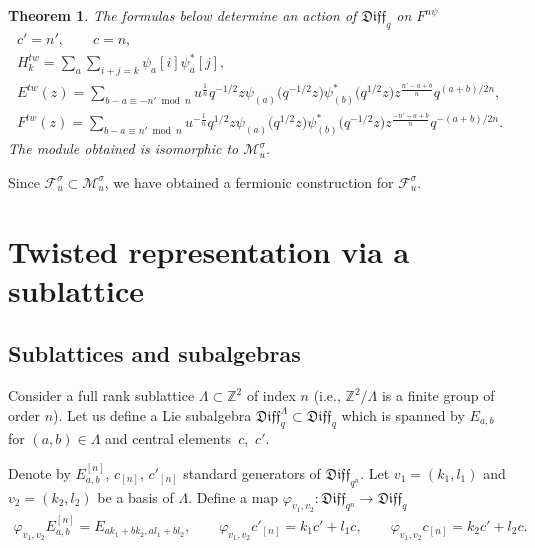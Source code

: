 \documentclass[11pt]{article}
\numberwithin{equation}{section}
\newtheorem{Theorem}{Theorem}[section]
\theoremstyle{definition}
\newcommand{\qD}{\mathfrak{Diff}_q}
\newcommand{\qDn}{\mathfrak{Diff}_{q^n}}
\newcommand{\psia}{\psi_{({a})}}
\newcommand{\psib}{\psi^*_{( b )}}
\begin{document}
\begin{Theorem}\label{TheFermionicTh}
The formulas below determine an action of $\qD$ on $F^{n\psi}$
\begin{gather}
c' = n', \qquad c=n,\nonumber\\
H^{tw}_k = \sum_{a} \sum_{i+j=k} \psi_a [i] \psi^*_a [j] , \nonumber\\
E^{tw}(z) = \sum_{b-a \equiv -n' \bmod n} u^{\frac{1}{n}} q^{-1/2} z \psia \big( q^{-1/2} z\big) \psib \big(q^{1/2} z\big) z^{\frac{n'-a+b}{n}} q^{(a+b)/2n}, \label{eq:EtwFermi} \\
F^{tw}(z) = \sum_{b-a \equiv n' \bmod n} u^{-\frac{1}{n}} q^{1/2} z \psia \big( q^{1/2} z\big) \psib \big(q^{-1/2} z\big) z^{\frac{-n'-a+b}{n}} q^{-(a+b)/2n}. \nonumber %
\end{gather}
The module obtained is isomorphic to $\mathcal{M}_u^{\sigma}$.
\end{Theorem}
Since $\mathcal{F}_u^{\sigma} \subset \mathcal{M}_u^{\sigma}$, we have obtained a fermionic construction for $\mathcal{F}_u^{\sigma}$.

\setcounter{section}{4}
\setcounter{subsection}{3}
\setcounter{subsubsection}{0}
\setcounter{Theorem}{4}
\setcounter{equation}{8}
\section{Twisted representation via a sublattice}\label{S:sublattice}

\subsection{Sublattices and subalgebras}

Consider a full rank sublattice $\Lambda \subset \mathbb{Z}^2$ of index $n$ (i.e., $\mathbb{Z}^2/\Lambda$ is a finite group of order $n$). Let us define a Lie subalgebra $\qD^{\Lambda} \subset \qD$ which is spanned by $E_{a,b}$ for $(a,b) \in \Lambda$ and central elements~$c$,~$c'$.

Denote by $E_{a,b}^{[n]}$, $c_{[n]}$, $c'_{[n]}$ standard generators of $\qDn$. Let $v_1 = (k_1, l_1)$ and $v_2 = (k_2, l_2)$ be a basis of $\Lambda$. Define a map $\varphi_{v_1, v_2}\colon \qDn \rightarrow \qD$
\begin{gather*}
\varphi_{v_1, v_2} E^{\scriptstyle{[n]}}_{a,b} = E_{a k_1 + b k_2, a l_1 + b l_2}, \qquad
\varphi_{v_1, v_2} c'_{\scriptstyle{[n]}} = k_1 c' + l_1 c, \qquad
\varphi_{v_1, v_2} c_{\scriptstyle{[n]}} = k_2 c' + l_2 c.
\end{gather*}
\end{document}
